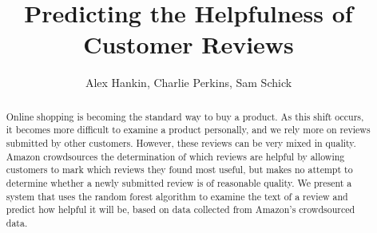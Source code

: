 \documentclass{article}
\title{Predicting the Helpfulness of Customer Reviews}
\author{Alex Hankin, Charlie Perkins, Sam Schick}
\date{}
\begin{document}
\maketitle

\begin{abstract}
	Online shopping is becoming the standard way to buy a product. As this shift occurs, it becomes more difficult to examine a product personally, and we rely more on reviews submitted by other customers. However, these reviews can be very mixed in quality. Amazon crowdsources the determination of which reviews are helpful by allowing customers to mark which reviews they found most useful, but makes no attempt to determine whether a newly submitted review is of reasonable quality. We present a system that uses the random forest algorithm to examine the text of a review and predict how helpful it will be, based on data collected from Amazon's crowdsourced data.
\end{abstract}
\end{document}
